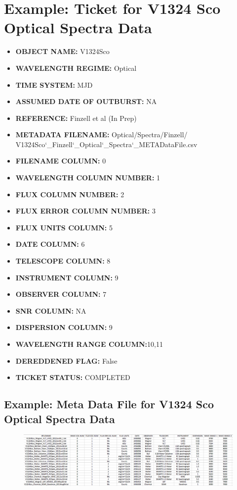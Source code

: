 \documentclass{article}
\begin{document}
\section{Example: Ticket for V1324 Sco Optical Spectra Data}
\label{sec:ExampTickSpectra}
\begin{itemize}
\item \textbf{OBJECT NAME:} V1324Sco
\item \textbf{WAVELENGTH REGIME:} Optical
\item \textbf{TIME SYSTEM:} MJD
\item \textbf{ASSUMED DATE OF OUTBURST:} NA
\item \textbf{REFERENCE:} Finzell et al (In Prep)
\item \textbf{METADATA FILENAME:} Optical/Spectra/Finzell/ V1324Sco\char`_Finzell\char`_Optical\char`_Spectra\char`_METADataFile.csv
\item \textbf{FILENAME COLUMN:} 0
\item \textbf{WAVELENGTH COLUMN NUMBER:} 1
\item \textbf{FLUX COLUMN NUMBER:} 2
\item \textbf{FLUX ERROR COLUMN NUMBER:} 3
\item \textbf{FLUX UNITS COLUMN:} 5
\item \textbf{DATE COLUMN:} 6
\item \textbf{TELESCOPE COLUMN:} 8
\item \textbf{INSTRUMENT COLUMN:} 9
\item \textbf{OBSERVER COLUMN:} 7
\item \textbf{SNR COLUMN:} NA
\item \textbf{DISPERSION COLUMN:} 9
\item \textbf{WAVELENGTH RANGE COLUMN:}10,11
\item \textbf{DEREDDENED FLAG:} False
\item \textbf{TICKET STATUS:} COMPLETED
\end{itemize}

\subsection{Example: Meta Data File for V1324 Sco Optical Spectra Data}
\label{sec:ExampTickSpectraMetaDataFile}
\begin{figure}[h]
\centering
\includegraphics[width=15cm]{Spectra_MetaDataFile_Example} 
\end{figure}
\end{document}

